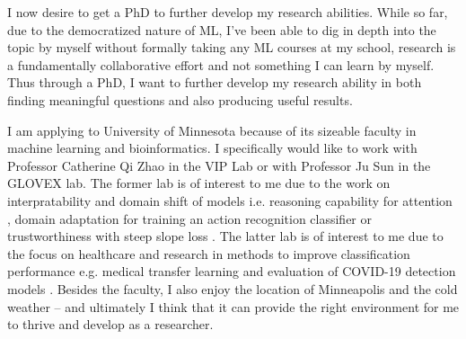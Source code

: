 \documentclass[12pt]{article}
\begin{document}
I now desire to get a PhD to further develop my research abilities. While so far, due to the democratized nature of ML, I've been able to dig in depth into the topic by myself without formally taking any ML courses at my school,
research is a fundamentally collaborative effort and not something I can learn by myself. Thus through a PhD, I want to further develop my research ability in both finding meaningful questions and also producing useful results.


I am applying to University of Minnesota because of its sizeable faculty in machine learning and bioinformatics. I specifically would like to work with Professor Catherine Qi Zhao in the VIP Lab or with Professor Ju Sun in the GLOVEX lab. The former lab is of interest to me due to the work on interpratability and domain shift of models i.e. reasoning capability for attention \cite{chen2021attention}, domain adaptation for training an action recognition classifier \cite{li2017attention} or trustworthiness with steep slope loss \cite{Luo_NeurIPS_2021}. The latter lab is of interest to me due to the focus on healthcare and research in methods to improve classification performance e.g. medical transfer learning \cite{peng2021rethink} and evaluation of COVID-19 detection models \cite{doi:10.1148/ryai.210217}. 
Besides the faculty, I also enjoy the location of Minneapolis and the cold weather -- and ultimately I think that it can provide the right environment for me to thrive and develop as a researcher.





\end{document}
